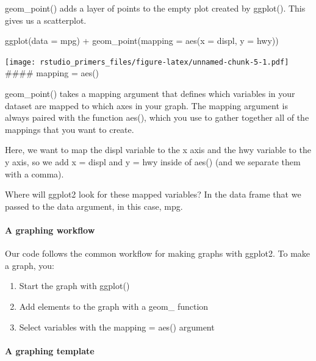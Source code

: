 \documentclass[
]{article}
\newenvironment{Shaded}{\begin{snugshade}}{\end{snugshade}}
\newcommand{\AttributeTok}[1]{\textcolor[rgb]{0.77,0.63,0.00}{#1}}
\newcommand{\FunctionTok}[1]{\textcolor[rgb]{0.00,0.00,0.00}{#1}}
\newcommand{\NormalTok}[1]{#1}
\newcommand{\SpecialCharTok}[1]{\textcolor[rgb]{0.00,0.00,0.00}{#1}}
\providecommand{\tightlist}{%
  \setlength{\itemsep}{0pt}\setlength{\parskip}{0pt}}
\begin{document}
geom\_point() adds a layer of points to the empty plot created by
ggplot(). This gives us a scatterplot.

\begin{Shaded}
\begin{Highlighting}[]
\FunctionTok{ggplot}\NormalTok{(}\AttributeTok{data =}\NormalTok{ mpg) }\SpecialCharTok{+} 
  \FunctionTok{geom\_point}\NormalTok{(}\AttributeTok{mapping =} \FunctionTok{aes}\NormalTok{(}\AttributeTok{x =}\NormalTok{ displ, }\AttributeTok{y =}\NormalTok{ hwy))}
\end{Highlighting}
\end{Shaded}

\texttt{[image: rstudio\_primers\_files/figure-latex/unnamed-chunk-5-1.pdf]}
\#\#\#\# mapping = aes()

geom\_point() takes a mapping argument that defines which variables in
your dataset are mapped to which axes in your graph. The mapping
argument is always paired with the function aes(), which you use to
gather together all of the mappings that you want to create.

Here, we want to map the displ variable to the x axis and the hwy
variable to the y axis, so we add x = displ and y = hwy inside of aes()
(and we separate them with a comma).

Where will ggplot2 look for these mapped variables? In the data frame
that we passed to the data argument, in this case, mpg.

\hypertarget{a-graphing-workflow}{%
\paragraph{A graphing workflow}\label{a-graphing-workflow}}

Our code follows the common workflow for making graphs with ggplot2. To
make a graph, you:

\begin{enumerate}
\def\labelenumi{\arabic{enumi}.}
\tightlist
\item
  Start the graph with ggplot()
\item
  Add elements to the graph with a geom\_ function
\item
  Select variables with the mapping = aes() argument
\end{enumerate}

\hypertarget{a-graphing-template}{%
\paragraph{A graphing template}\label{a-graphing-template}}
\end{document}
